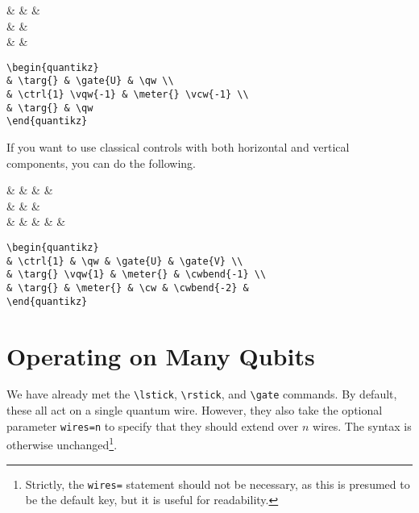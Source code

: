 \documentclass[aps,pra,10pt,nofootinbib]{revtex4}
\begin{document}
\begin{Code}
\begin{center}
\begin{quantikz}
& \targ{} &  & \qw \\
&   & \meter{}  \\
& \targ{} & \qw
\end{quantikz}
\end{center}
\tcblower
\begin{lstlisting}
\begin{quantikz}
& \targ{} & \gate{U} & \qw \\
& \ctrl{1} \vqw{-1} & \meter{} \vcw{-1} \\
& \targ{} & \qw
\end{quantikz}
\end{lstlisting}
\end{Code}
If you want to use classical controls with both horizontal and vertical components, you can do the following.
\begin{Code}
\begin{center}
\begin{quantikz}
&  & \qw &  &  \\
& \targ{}  & \meter{} &   \\
& \targ{} & \meter{} & \cw &  &
\end{quantikz}
\end{center}
\tcblower
\begin{lstlisting}
\begin{quantikz}
& \ctrl{1} & \qw & \gate{U} & \gate{V} \\
& \targ{} \vqw{1} & \meter{} & \cwbend{-1} \\
& \targ{} & \meter{} & \cw & \cwbend{-2} &
\end{quantikz}
\end{lstlisting}
\end{Code}

\section{Operating on Many Qubits}

We have already met the \verb!\lstick!, \verb!\rstick!, and \verb!\gate! commands. By default, these all act on a single quantum wire. However, they also take the optional parameter \verb!wires=n! to specify that they should extend over $n$ wires. The syntax is otherwise unchanged\footnote{Strictly, the \texttt{wires=} statement should not be necessary, as this is presumed to be the default key, but it is useful for readability.}.
\end{document}
